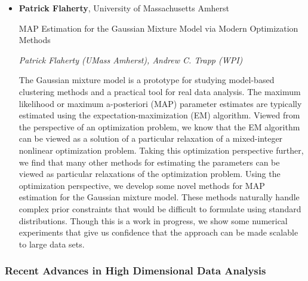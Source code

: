 \begin{itemize}
\item \textbf{Patrick Flaherty}, University of Massachusetts Amherst

MAP Estimation for the Gaussian Mixture Model via Modern Optimization Methods

\emph{\footnotesize Patrick Flaherty (UMass Amherst), Andrew C. Trapp (WPI)}

The Gaussian mixture model is a prototype for studying model-based clustering methods and a practical tool for real data analysis. The maximum likelihood or maximum a-posteriori (MAP) parameter estimates are typically estimated using the expectation-maximization (EM) algorithm. Viewed from the perspective of an optimization problem, we know that the EM algorithm can be viewed as a solution of a particular relaxation of a mixed-integer nonlinear optimization problem. Taking this optimization perspective further, we find that many other methods for estimating the parameters can be viewed as particular relaxations of the optimization problem. Using the optimization perspective, we develop some novel methods for MAP estimation for the Gaussian mixture model. These methods naturally handle complex prior constraints that would be difficult to formulate using standard distributions. Though this is a work in progress, we show some numerical experiments that give us confidence that the approach can be made scalable to large data sets.

\end{itemize}

\subsubsection*{Recent Advances in High Dimensional Data Analysis}

